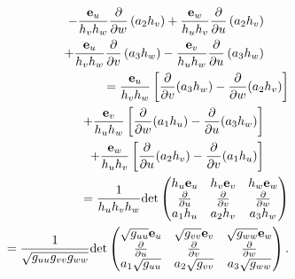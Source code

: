 \begin{equation}
\begin{split}
-\frac{{\bf e}_u}{h_vh_w} \frac{\partial   }{\partial w}
\left( a_2 h_v \right)
+
\frac{{\bf e}_w}{h_uh_v} \frac{\partial   }{\partial u}
\left( a_2 h_v \right)
\qquad \\
+ \frac{{\bf e}_u}{h_vh_w} \frac{\partial   }{\partial v}
\left( a_3 h_w \right)
-
\frac{{\bf e}_v}{h_uh_w} \frac{\partial   }{\partial u}
\left( a_3 h_w \right)
 \qquad
\\ =
\frac{{\bf e}_u}{h_vh_w}
\left[
\frac{\partial}{\partial v} (a_3 h_w) -
\frac{\partial}{\partial w} (a_2 h_v)
\right]
\\ +
\frac{{\bf e}_v}{h_uh_w}
\left[
\frac{\partial}{\partial w} (a_1 h_u) -
\frac{\partial}{\partial u} (a_3 h_w)
\right]
\qquad \\ +
\frac{{\bf e}_w}{h_uh_v}
\left[
\frac{\partial}{\partial u} (a_2 h_v) -
\frac{\partial}{\partial v} (a_1 h_u)
\right]
\qquad
\\
=
\frac{1}{h_u h_v h_w}
\text{det}
\begin{pmatrix}
h_u {\bf e}_u &
h_v {\bf e}_v &
h_w {\bf e}_w \\
\frac{\partial }{\partial u} &
\frac{\partial }{\partial v} &
\frac{\partial }{\partial w} \\
a_1 h_u &
a_2 h_v &
a_3 h_w
\end{pmatrix}
\\
=
\frac{1}{\sqrt{g_{uu} g_{vv} g_{ww}}}
\text{det}
\begin{pmatrix}
\sqrt{ g_{uu} } {\bf e}_u &
\sqrt{ g_{vv} } {\bf e}_v &
\sqrt{ g_{ww} } {\bf e}_w \\
\frac{\partial }{\partial u} &
\frac{\partial }{\partial v} &
\frac{\partial }{\partial w} \\
a_1 \sqrt{ g_{uu} } &
a_2 \sqrt{ g_{vv} } &
a_3 \sqrt{ g_{ww} }
\end{pmatrix}
.
\end{split}
\label{2018-mm-ch-curloclc}
\end{equation}


